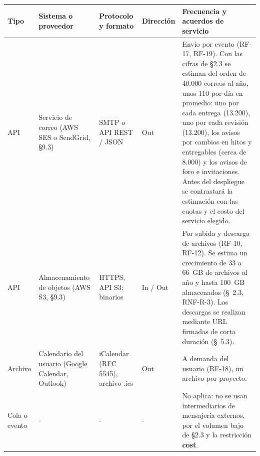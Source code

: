 \documentclass[10pt,a4paper]{article}
\newcommand{\hrow}{\rowcolor{encabezado}}
\newcommand{\h}[1]{\textbf{#1}}
\begin{document}
\begin{xltabular}{\linewidth}{|P{2.4cm}|P{3.0cm}|P{3.0cm}|P{2.0cm}|L|}
\hline\hrow \h{Tipo} & \h{Sistema o proveedor} & \h{Protocolo y formato} & \h{Dirección} & \h{Frecuencia y acuerdos de servicio} \\ \hline
\endhead
API & Servicio de correo (AWS SES o SendGrid, §9.3) & SMTP o API REST / JSON & Out & Envío por evento (RF-17, RF-19). Con las cifras de §2.3 se estiman del orden de 40.000 correos al año, unos 110 por día en promedio: uno por cada entrega (13.200), uno por cada revisión (13.200), los avisos por cambios en hitos y entregables (cerca de 8.000) y los avisos de foro e invitaciones. Antes del despliegue se contrastará la estimación con las cuotas y el costo del servicio elegido. \\ \hline

API & Almacenamiento de objetos (AWS S3, §9.3) & HTTPS, API S3; binarios & In / Out & Por subida y descarga de archivos (RF-10, RF-12). Se estima un crecimiento de 33 a 66~GB de archivos al año y hasta 100~GB almacenados (\S~2.3, RNF-R-3). Las descargas se realizan mediante URL firmadas de corta duración (\S~5.3). \\ \hline

Archivo & Calendario del usuario (Google Calendar, Outlook) & iCalendar (RFC 5545), archivo .ics & Out & A demanda del usuario (RF-18), un archivo por proyecto. \\ \hline

Cola o evento & - & - & - & No aplica: no se usan intermediarios de mensajería externos, por el volumen bajo de §2.3 y la restricción \textbf{cost}. \\ \hline

\end{xltabular}
\end{document}
